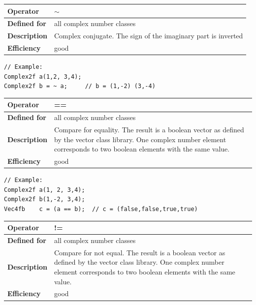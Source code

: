 \documentclass[11pt,a4paper,oneside,openright]{report}
\newcommand{\vspacesmall}{\vspace{3mm}}
\newcommand{\vspacebig}{\vspace{6mm}}
\begin{document}
\begin{tabular}{|p{25mm}|p{100mm}|}
\hline
\bfseries Operator & $\sim$ \\ \hline
\bfseries Defined for & all complex number classes  \\ \hline
\bfseries Description & Complex conjugate. The sign of the imaginary part is inverted \\ \hline
\bfseries Efficiency & good \\ \hline
\end{tabular}
\vspacesmall

\begin{lstlisting}[frame=none]
// Example:
Complex2f a(1,2, 3,4);
Complex2f b = ~ a;     // b = (1,-2) (3,-4)
\end{lstlisting}
\vspacebig


\begin{tabular}{|p{25mm}|p{100mm}|}
\hline
\bfseries Operator & == \\ \hline
\bfseries Defined for & all complex number classes  \\ \hline
\bfseries Description & Compare for equality.\newline
The result is a boolean vector as defined by the vector class library.\newline
One complex number element corresponds to two boolean elements with the same value. \\ \hline
\bfseries Efficiency & good \\ \hline
\end{tabular}
\vspacesmall

\begin{lstlisting}[frame=none]
// Example:
Complex2f a(1, 2, 3,4);
Complex2f b(1,-2, 3,4);
Vec4fb    c = (a == b);  // c = (false,false,true,true)
\end{lstlisting}
\vspacebig


\begin{tabular}{|p{25mm}|p{100mm}|}
\hline
\bfseries Operator & != \\ \hline
\bfseries Defined for & all complex number classes  \\ \hline
\bfseries Description & Compare for not equal.\newline
The result is a boolean vector as defined by the vector class library.\newline
One complex number element corresponds to two boolean elements with the same value. \\ \hline
\bfseries Efficiency & good \\ \hline
\end{tabular}
\vspacesmall
\end{document}
